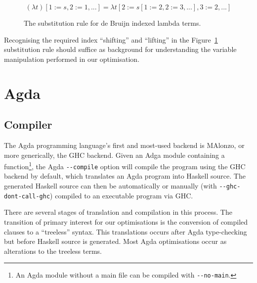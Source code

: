 \begin{figure}[h]
\begin{equation*}
(\lambda t)[1 := s, 2 := 1, ...] = \lambda t[2 := s[1 := 2, 2 := 3, ...], 3 := 2, ...]
\end{equation*}
\caption{The substitution rule for de Bruijn indexed lambda terms.}
\label{eq:debruijn_sub}
\end{figure}

Recognising the required index ``shifting'' and ``lifting'' in the Figure~\ref{eq:debruijn_sub} substitution rule should suffice as background for understanding the variable manipulation performed in our optimisation.

\section{Agda}
\label{sec:background_agda}

\subsection{Compiler}

The Agda programming language's first and most-used backend is MAlonzo, or more generically, the GHC backend.\citep{benke2007} Given an Adga module containing a  function\footnote{An Agda module without a main file can be compiled with \texttt{-{}-no-main}.}, the Agda \texttt{-{}-compile} option will compile the program using the GHC backend by default, which translates an Agda program into Haskell source. The generated Haskell source can then be automatically or manually (with \texttt{-{}-ghc-dont-call-ghc}) compiled to an executable program via GHC.\citep{agdadocs} %

There are several stages of translation and compilation in this process. The transition of primary interest for our optimisations is the conversion of compiled clauses to a ``treeless'' syntax. This translations occurs after Agda type-checking but before Haskell source is generated. Most Agda optimisations occur as alterations to the treeless terms.

